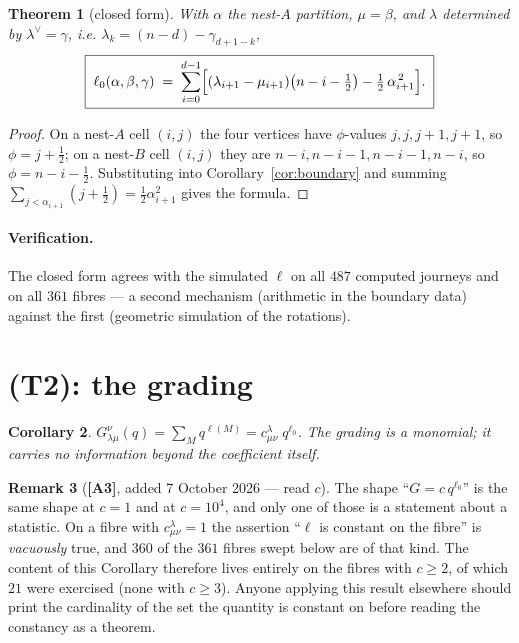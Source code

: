 \documentclass[11pt]{article}
\theoremstyle{plain}
\newtheorem{theorem}{Theorem}
\newtheorem{corollary}[theorem]{Corollary}
\theoremstyle{definition}
\newtheorem{remark}[theorem]{Remark}
\begin{document}
\begin{theorem}[closed form]\label{thm:closed}
With $\alpha$ the nest-$A$ partition, $\mu=\beta$, and $\lambda$ determined by
$\lambda^{\vee}=\gamma$, i.e. $\lambda_k=(n-d)-\gamma_{d+1-k}$,
\[
 \boxed{\;\ell_0(\alpha,\beta,\gamma)\;=\;\sum_{i=0}^{d-1}
   \Bigl[(\lambda_{i+1}-\mu_{i+1})\bigl(n-i-\tfrac12\bigr)
          -\tfrac12\,\alpha_{i+1}^{\,2}\Bigr].\;}
\]
\end{theorem}
\begin{proof}
On a nest-$A$ cell $(i,j)$ the four vertices have $\phi$-values $j,j,j{+}1,j{+}1$, so
$\phi=j+\tfrac12$; on a nest-$B$ cell $(i,j)$ they are
$n{-}i,n{-}i{-}1,n{-}i{-}1,n{-}i$, so $\phi=n-i-\tfrac12$.  Substituting into
Corollary~\ref{cor:boundary} and summing
$\sum_{j<\alpha_{i+1}}(j+\tfrac12)=\tfrac12\alpha_{i+1}^2$ gives the formula.
\end{proof}

\paragraph{Verification.}  The closed form agrees with the simulated $\ell$ on all
$487$ computed journeys and on all $361$ fibres --- a second mechanism (arithmetic in
the boundary data) against the first (geometric simulation of the rotations).

\section{(T2): the grading}

\begin{corollary}
$G^{\nu}_{\lambda\mu}(q)=\sum_{M}q^{\ell(M)}=c^{\lambda}_{\mu\nu}\;q^{\ell_0}$.
The grading is a monomial; it carries no information beyond the coefficient itself.
\end{corollary}

\begin{remark}[\textbf{[A3]}, added 7 October 2026 --- read $c$]
The shape ``$G=c\,q^{\ell_0}$'' is the same shape at $c=1$ and at $c=10^4$, and only
one of those is a statement about a statistic.  On a fibre with
$c^{\lambda}_{\mu\nu}=1$ the assertion ``$\ell$ is constant on the fibre'' is
\emph{vacuously} true, and $360$ of the $361$ fibres swept below are of that kind.
The content of this Corollary therefore lives entirely on the fibres with $c\ge2$, of
which $21$ were exercised (none with $c\ge3$).  Anyone applying this result elsewhere
should print the cardinality of the set the quantity is constant on before reading
the constancy as a theorem.
\end{remark}
\end{document}
